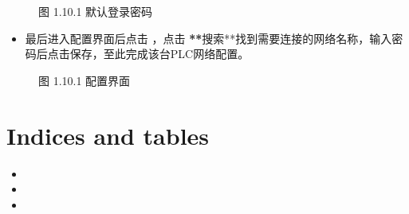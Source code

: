 \documentclass[a4paper,10pt,english]{sphinxmanual}
\begin{document}
\begin{figure}[htbp]
\centering
\capstart

\noindent{}
\caption{图 1.10.1 默认登录密码}\label{\detokenize{operation_guide:id29}}\end{figure}
\begin{itemize}
\item {} 
\sphinxAtStartPar
最后进入配置界面后点击 ，点击 {\color{red}\bfseries{}**}搜索**找到需要连接的网络名称，输入密码后点击保存，至此完成该台PLC网络配置。

\end{itemize}

\begin{figure}[htbp]
\centering
\capstart

\noindent{}
\caption{图 1.10.1 配置界面}\label{\detokenize{operation_guide:id30}}\end{figure}


\chapter{Indices and tables}
\label{\detokenize{index:indices-and-tables}}\begin{itemize}
\item {} 
\sphinxAtStartPar
{}

\item {} 
\sphinxAtStartPar
{}

\item {} 
\sphinxAtStartPar
{}

\end{itemize}



\renewcommand{\indexname}{索引}
\printindex
\end{document}
